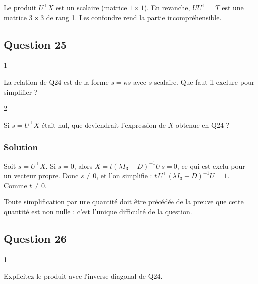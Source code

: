 \documentclass[11pt,a4paper]{article}
\newcommand{\equationajustee}[1]{%
  \sbox{\boiteequation}{$\displaystyle #1$}%
  \ifdim\wd\boiteequation>\linewidth
    \[\resizebox{\linewidth}{!}{\usebox{\boiteequation}}\]%
  \else
    \[#1\]%
  \fi}
\begin{document}
\begin{piege}

Le produit \(U^\top X\) est un scalaire (matrice \(1\times1\)). En revanche, \(UU^\top=T\) est une matrice \(3\times3\) de rang 1. Les confondre rend la partie incompréhensible.

\end{piege}

\hypertarget{question-25}{%
\subsection{Question 25}\label{question-25}}

\begin{indication}{1}

La relation de Q24 est de la forme \(s=\kappa s\) avec \(s\) scalaire. Que faut-il exclure pour simplifier ?

\end{indication}

\begin{indication}{2}

Si \(s=U^\top X\) était nul, que deviendrait l'expression de \(X\) obtenue en Q24 ?

\end{indication}

\hypertarget{solution-24}{%
\subsubsection{Solution}\label{solution-24}}

Soit \(s=U^\top X\). Si \(s=0\), alors \(X=t(\lambda I_3-D)^{-1}U\,s=0\), ce qui est exclu pour un vecteur propre.
Donc \(s\neq0\), et l'on simplifie : \(t\,U^\top(\lambda I_3-D)^{-1}U=1\). Comme \(t\neq0\),
\equationajustee{\boxed{U^\top(\lambda I_3-D)^{-1}U=\frac1t.}}

\begin{jury}

Toute simplification par une quantité doit être précédée de la preuve que cette quantité est non nulle : c'est l'unique difficulté de la question.

\end{jury}

\hypertarget{question-26}{%
\subsection{Question 26}\label{question-26}}

\begin{indication}{1}

Explicitez le produit avec l'inverse diagonal de Q24.

\end{indication}
\end{document}

